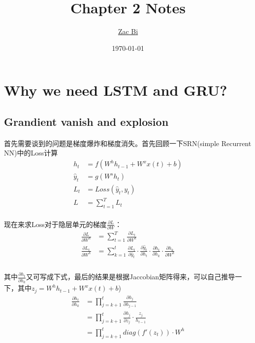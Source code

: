 \documentclass{article}
\begin{document}
\begin{titlepage}
    \title{Chapter 2 Notes}
    \author{\href{https://github.com/ZacBi}{Zac Bi}}
    \date{\today}
    \maketitle
    \pagestyle{empty}
\end{titlepage}

\section{Why we need LSTM and GRU?}

\subsection{Grandient vanish and explosion}

\paragraph*{}
首先需要谈到的问题是梯度爆炸和梯度消失。首先回顾一下SRN(simple Recurrent NN)中的Loss计算
\begin{align*}
    h_t &= f(W^h h_{t-1} + W^x x(t) + b) \\
    \hat{y}_t &= g(W^s h_t) \\
    L_t &= Loss(\hat{y}_t, y_t) \\
    L &= \sum_{t=1}^{T} L_t
\end{align*}

\paragraph*{}
现在来求Loss对于隐层单元的梯度$\frac{\partial L}{\partial W}$：
\begin{align*}
    \frac{\partial L}{\partial W^h} & = \sum_{t=1}^{T} \frac{\partial L_t}{\partial W^h} \\
    \frac{\partial L_t}{\partial W^h} & = \sum_{k=1}^{t} \frac{\partial L_t}{\partial \hat{y}_t} 
    \cdot \frac{\partial \hat{y}_t}{\partial{h_t}}
    \cdot \frac{\partial h_t}{\partial{h_k}} 
    \cdot \frac{\partial h_k}{\partial{W^h}}
    \\
\end{align*}

\paragraph*{}
其中$\frac{\partial h_t}{\partial{h_k}}$又可写成下式，最后的结果是根据Jaccobian矩阵得来，可以自己推导一下，其中$z_j = W^h h_{t-1} + W^x x(t) + b$)
\begin{align*}
    \frac{\partial h_t}{\partial{h_k}} & = \prod_{j=k+1}^{t} \frac{\partial h_j}{\partial h_{j-1}} \\
    & = \prod_{j=k+1}^{t} \frac{\partial h_j}{\partial z_j} \cdot \frac{z_j}{h_{t-1}} \\
    & = \prod_{j=k+1}^{t} diag(f'(z_t)) \cdot W^h
\end{align*}
\end{document}
